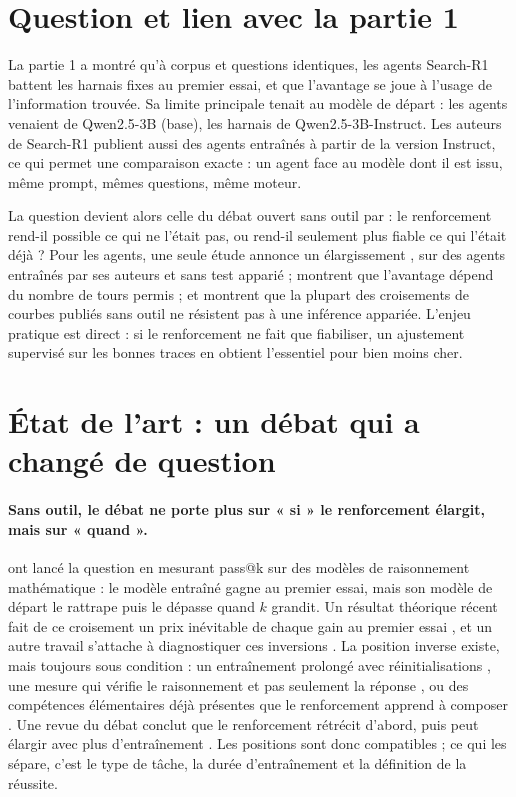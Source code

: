 \section{Question et lien avec la partie 1}

La partie 1 a montré qu'à corpus et questions identiques, les agents Search-R1 battent les harnais fixes au premier essai, et que l'avantage se joue à l'usage de l'information trouvée. Sa limite principale tenait au modèle de départ : les agents venaient de Qwen2.5-3B (base), les harnais de Qwen2.5-3B-Instruct. Les auteurs de Search-R1 publient aussi des agents entraînés à partir de la version Instruct, ce qui permet une comparaison exacte : un agent face au modèle dont il est issu, même prompt, mêmes questions, même moteur.

La question devient alors celle du débat ouvert sans outil par \citet{yue2025does} : le renforcement rend-il possible ce qui ne l'était pas, ou rend-il seulement plus fiable ce qui l'était déjà ? Pour les agents, une seule étude annonce un élargissement \citep{zhai2026does}, sur des agents entraînés par ses auteurs et sans test apparié ; \citet{zhu2026what} montrent que l'avantage dépend du nombre de tours permis ; et \citet{yang2026crossovers} montrent que la plupart des croisements de courbes publiés sans outil ne résistent pas à une inférence appariée. L'enjeu pratique est direct : si le renforcement ne fait que fiabiliser, un ajustement supervisé sur les bonnes traces en obtient l'essentiel pour bien moins cher.

\section{État de l'art : un débat qui a changé de question}

\paragraph{Sans outil, le débat ne porte plus sur « si » le renforcement élargit, mais sur « quand ».} \citet{yue2025does} ont lancé la question en mesurant pass@k sur des modèles de raisonnement mathématique : le modèle entraîné gagne au premier essai, mais son modèle de départ le rattrape puis le dépasse quand $k$ grandit. Un résultat théorique récent fait de ce croisement un prix inévitable de chaque gain au premier essai \citep{liu2026nofreelunch}, et un autre travail s'attache à diagnostiquer ces inversions \citep{zhou2026shrinks}. La position inverse existe, mais toujours sous condition : un entraînement prolongé avec réinitialisations \citep{liu2025prorl}, une mesure qui vérifie le raisonnement et pas seulement la réponse \citep{wen2025implicitly}, ou des compétences élémentaires déjà présentes que le renforcement apprend à composer \citep{cheng2025atomic}. Une revue du débat conclut que le renforcement rétrécit d'abord, puis peut élargir avec plus d'entraînement \citep{yao2025debate}. Les positions sont donc compatibles ; ce qui les sépare, c'est le type de tâche, la durée d'entraînement et la définition de la réussite.

